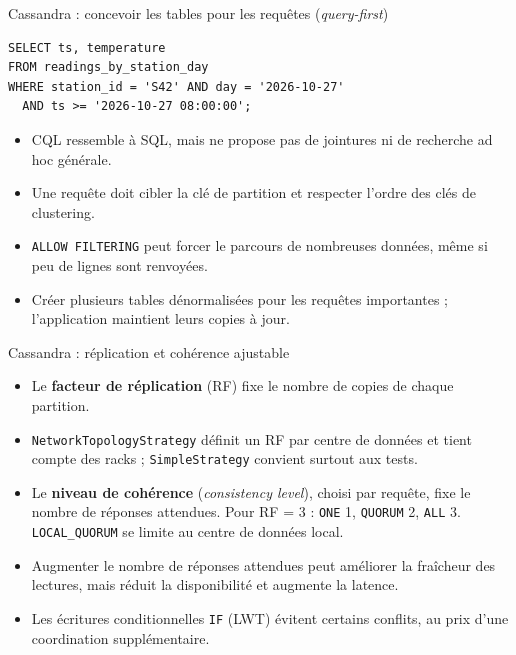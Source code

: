 \begin{frame}[fragile]{Cassandra : concevoir les tables pour les requêtes
    (\textit{query-first})}
    \begin{verbatim}
SELECT ts, temperature
FROM readings_by_station_day
WHERE station_id = 'S42' AND day = '2026-10-27'
  AND ts >= '2026-10-27 08:00:00';
\end{verbatim}
    \begin{itemize}
        \item CQL ressemble à SQL, mais ne propose pas de jointures ni de
              recherche ad hoc générale.
        \item Une requête doit cibler la clé de partition et respecter l'ordre
              des clés de clustering.
        \item \texttt{ALLOW FILTERING} peut forcer le parcours de nombreuses
              données, même si peu de lignes sont renvoyées.
        \item Créer plusieurs tables dénormalisées pour les requêtes importantes
              ; l'application maintient leurs copies à jour.
    \end{itemize}
\end{frame}

\begin{frame}{Cassandra : réplication et cohérence ajustable}
    \begin{itemize}
        \item Le \textbf{facteur de réplication} (RF) fixe le nombre de copies
              de chaque partition.
        \item \texttt{NetworkTopologyStrategy} définit un RF par centre de
              données et tient compte des racks ; \texttt{SimpleStrategy}
              convient surtout aux tests.
        \item Le \textbf{niveau de cohérence} (\textit{consistency level}),
              choisi par requête, fixe le nombre de réponses attendues. Pour RF
              = 3 : \texttt{ONE} 1, \texttt{QUORUM} 2, \texttt{ALL} 3.
              \texttt{LOCAL\_QUORUM} se limite au centre de données local.
        \item Augmenter le nombre de réponses attendues peut améliorer la
              fraîcheur des lectures, mais réduit la disponibilité et augmente
              la latence.
        \item Les écritures conditionnelles \texttt{IF} (LWT) évitent certains
              conflits, au prix d'une coordination supplémentaire.
    \end{itemize}

\end{frame}

